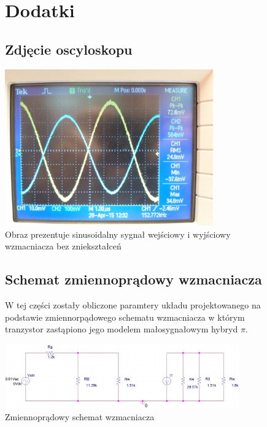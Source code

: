 \documentclass[a4paper,12pt]{article}
\begin{document}



\begin{figure}[h!]
\section{Dodatki}
\subsection{Zdjęcie oscyloskopu}
  \begin{center}
  \includegraphics[width=0.8\textwidth]{zdj.jpg}
  \caption{Obraz prezentuje sinusoidalny sygnał wejściowy i wyjściowy wzmacniacza bez zniekształceń }
  \end{center}
  \end{figure}
  \begin{figure}
\subsection{Schemat zmiennoprądowy wzmacniacza}
W tej części zostały obliczone paramtery układu projektowanego na podstawie zmiennorpądowego schematu
wzmacniacza w którym tranzystor zastąpiono jego modelem małosygnałowym hybryd $\pi$.

  \begin{center}
  \includegraphics[width=0.9\textwidth]{pi.jpg}
  \caption{Zmiennoprądowy schemat wzmacniacza }
  \end{center}

\end{figure}
\end{document}
